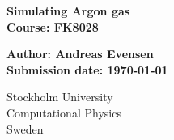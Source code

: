 \thispagestyle{empty}
\begin{titlepage}
   \begin{center}
       \huge
       \textbf{Simulating Argon gas}\\
       \vspace*{1cm}
       \textbf{Course: FK8028}
       \large

       \vspace*{0.5cm}
       \textbf{Author: Andreas Evensen}\\
       \vspace*{.5cm}
       \small
       \vspace*{1.cm}
       \textbf{Submission date: \today}\\
       \vspace*{.5cm}
       \vspace{0.8cm}
     
       \small
       Stockholm University\\
       Computational Physics\\
       Sweden\\
   \end{center}
\end{titlepage}